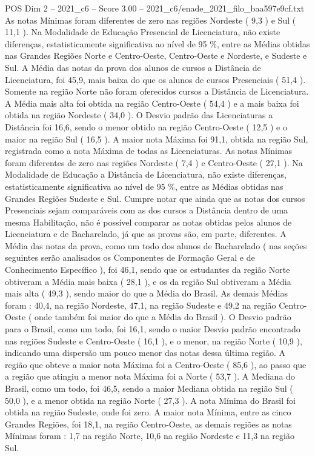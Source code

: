 \begin{textsample}{POS Dim 2 – 2021\_c6 – Score 3.00 – 2021\_c6/enade\_2021\_filo\_baa597e9cf.txt}
As notas Mínimas foram diferentes de zero nas regiões Nordeste ( 9,3 ) e Sul ( 11,1 ).
Na Modalidade de Educação Presencial de Licenciatura, não existe diferenças, estatisticamente significativa ao nível de 95 \%, entre as Médias obtidas nas Grandes Regiões Norte e Centro-Oeste, Centro-Oeste e Nordeste, e Sudeste e Sul.
A Média das notas da prova dos alunos de cursos a Distância de Licenciatura, foi 45,9, mais baixa do que os alunos de cursos Presenciais ( 51,4 ).
Somente na região Norte não foram oferecidos cursos a Distância de Licenciatura.
A Média mais alta foi obtida na região Centro-Oeste ( 54,4 ) e a mais baixa foi obtida na região Nordeste ( 34,0 ).
O Desvio padrão das Licenciaturas a Distância foi 16,6, sendo o menor obtido na região Centro-Oeste ( 12,5 ) e o maior na região Sul ( 16,5 ).
A maior nota Máxima foi 91,1, obtida na região Sul, registrada como a nota Máxima de todas as Licenciaturas.
As notas Mínimas foram diferentes de zero nas regiões Nordeste ( 7,4 ) e Centro-Oeste ( 27,1 ).
Na Modalidade de Educação a Distância de Licenciatura, não existe diferenças, estatisticamente significativa ao nível de 95 \%, entre as Médias obtidas nas Grandes Regiões Sudeste e Sul.
Cumpre notar que ainda que as notas dos cursos Presenciais sejam comparáveis com as dos cursos a Distância dentro de uma mesma Habilitação, não é possível comparar as notas obtidas pelos alunos de Licenciatura e de Bacharelado, já que as provas são, em parte, diferentes.
A Média das notas da prova, como um todo dos alunos de Bacharelado ( nas seções seguintes serão analisados os Componentes de Formação Geral e de Conhecimento Específico ), foi 46,1, sendo que os estudantes da região Norte obtiveram a Média mais baixa ( 28,1 ), e os da região Sul obtiveram a Média mais alta ( 49,3 ), sendo maior do que a Média do Brasil.
As demais Médias foram : 40,4, na região Nordeste, 47,1, na região Sudeste e 49,2 na região Centro-Oeste ( onde também foi maior do que a Média do Brasil ).
O Desvio padrão para o Brasil, como um todo, foi 16,1, sendo o maior Desvio padrão encontrado nas regiões Sudeste e Centro-Oeste ( 16,1 ), e o menor, na região Norte ( 10,9 ), indicando uma dispersão um pouco menor das notas dessa última região.
A região que obteve a maior nota Máxima foi a Centro-Oeste ( 85,6 ), ao passo que a região que atingiu a menor nota Máxima foi a Norte ( 53,7 ).
A Mediana do Brasil, como um todo, foi 46,5, sendo a maior Mediana obtida na região Sul ( 50,0 ), e a menor obtida na região Norte ( 27,3 ).
A nota Mínima do Brasil foi obtida na região Sudeste, onde foi zero.
A maior nota Mínima, entre as cinco Grandes Regiões, foi 18,1, na região Centro-Oeste, as demais regiões as notas Mínimas foram : 1,7 na região Norte, 10,6 na região Nordeste e 11,3 na região Sul.

\end{textsample}
